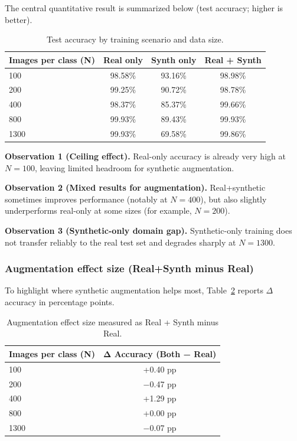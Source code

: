 The central quantitative result is summarized below (test accuracy; higher is better).

\begin{table}[H]
\centering
\caption{Test accuracy by training scenario and data size.}
\label{tab:accuracy-summary}
\begin{tabular}{@{}lccc@{}}
\toprule
Images per class (N) & Real only & Synth only & Real + Synth \\
\midrule
100 & 98.58\% & 93.16\% & 98.98\% \\
200 & 99.25\% & 90.72\% & 98.78\% \\
400 & 98.37\% & 85.37\% & 99.66\% \\
800 & 99.93\% & 89.43\% & 99.93\% \\
1300 & 99.93\% & 69.58\% & 99.86\% \\
\bottomrule
\end{tabular}
\end{table}

\textbf{Observation 1 (Ceiling effect).} Real-only accuracy is already very high at \(N=100\), leaving limited headroom for synthetic augmentation.

\textbf{Observation 2 (Mixed results for augmentation).} Real+synthetic sometimes improves performance (notably at \(N=400\)), but also slightly underperforms real-only at some sizes (for example, \(N=200\)).

\textbf{Observation 3 (Synthetic-only domain gap).} Synthetic-only training does not transfer reliably to the real test set and degrades sharply at \(N=1300\).

\subsubsection{Augmentation effect size (Real+Synth minus Real)}

To highlight where synthetic augmentation helps most, Table~\ref{tab:augmentation-delta} reports \(\Delta\) accuracy in percentage points.

\begin{table}[H]
\centering
\caption{Augmentation effect size measured as Real + Synth minus Real.}
\label{tab:augmentation-delta}
\begin{tabular}{@{}lc@{}}
\toprule
Images per class (N) & Δ Accuracy (Both − Real) \\
\midrule
100 & +0.40 pp \\
200 & −0.47 pp \\
400 & +1.29 pp \\
800 & +0.00 pp \\
1300 & −0.07 pp \\
\bottomrule
\end{tabular}
\end{table}

